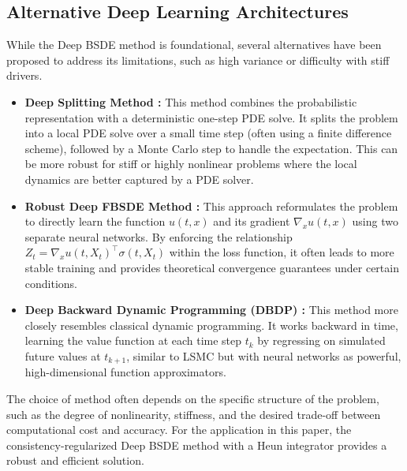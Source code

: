 \subsection{Alternative Deep Learning Architectures}
While the Deep BSDE method is foundational, several alternatives have been proposed to address its limitations, such as high variance or difficulty with stiff drivers.
\begin{itemize}
    \item \textbf{Deep Splitting Method \cite{Beck2019}:} This method combines the probabilistic representation with a deterministic one-step PDE solve. It splits the problem into a local PDE solve over a small time step (often using a finite difference scheme), followed by a Monte Carlo step to handle the expectation. This can be more robust for stiff or highly nonlinear problems where the local dynamics are better captured by a PDE solver.
    \item \textbf{Robust Deep FBSDE Method \cite{Goudenegge2020}:} This approach reformulates the problem to directly learn the function $u(t,x)$ and its gradient \(\nabla_x u(t,x)\) using two separate neural networks. By enforcing the relationship \(Z_t = \nabla_x u(t,X_t)^\top \sigma(t,X_t)\) within the loss function, it often leads to more stable training and provides theoretical convergence guarantees under certain conditions.
    \item \textbf{Deep Backward Dynamic Programming (DBDP) \cite{Hure2020}:} This method more closely resembles classical dynamic programming. It works backward in time, learning the value function at each time step \(t_k\) by regressing on simulated future values at \(t_{k+1}\), similar to LSMC but with neural networks as powerful, high-dimensional function approximators.
\end{itemize}
The choice of method often depends on the specific structure of the problem, such as the degree of nonlinearity, stiffness, and the desired trade-off between computational cost and accuracy. For the application in this paper, the consistency-regularized Deep BSDE method with a Heun integrator provides a robust and efficient solution.

